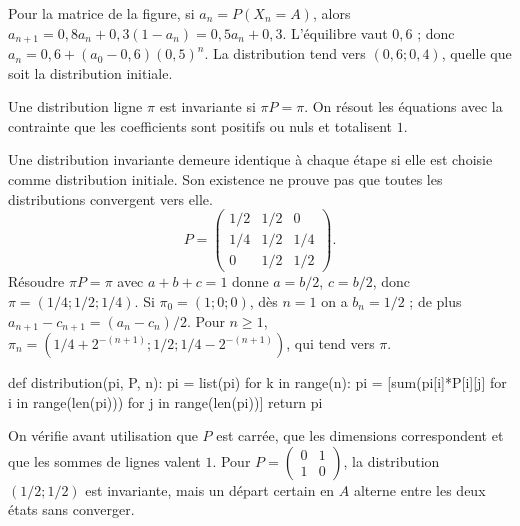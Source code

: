 Pour la matrice de la figure, si $a_n=P(X_n=A)$, alors $a_{n+1}=0{,}8a_n+0{,}3(1-a_n)=0{,}5a_n+0{,}3$.
L'équilibre vaut $0{,}6$ ; donc $a_n=0{,}6+(a_0-0{,}6)(0{,}5)^n$.
La distribution tend vers $(0{,}6;0{,}4)$, quelle que soit la distribution initiale.
\begin{definition}
Une distribution ligne $\pi$ est invariante si $\pi P=\pi$.
On résout les équations avec la contrainte que les coefficients sont positifs ou nuls et totalisent $1$.
\end{definition}
Une distribution invariante demeure identique à chaque étape si elle est choisie comme distribution initiale. Son existence ne prouve pas que toutes les distributions convergent vers elle.
\[P=\begin{pmatrix}1/2&1/2&0\\1/4&1/2&1/4\\0&1/2&1/2\end{pmatrix}.
\]
Résoudre $\pi P=\pi$ avec $a+b+c=1$ donne $a=b/2$, $c=b/2$, donc $\pi=(1/4;1/2;1/4)$.
Si $\pi_0=(1;0;0)$, dès $n=1$ on a $b_n=1/2$ ; de plus $a_{n+1}-c_{n+1}=(a_n-c_n)/2$.
Pour $n\geq1$,
$\pi_n=(1/4+2^{-(n+1)};1/2;1/4-2^{-(n+1)})$, qui tend vers $\pi$.
\begin{python}
def distribution(pi, P, n):
    pi = list(pi)
    for k in range(n):
        pi = [sum(pi[i]*P[i][j] for i in range(len(pi)))
              for j in range(len(pi))]
    return pi
\end{python}
On vérifie avant utilisation que $P$ est carrée, que les dimensions correspondent et que les sommes de lignes valent $1$.
Pour $P=\left(\begin{smallmatrix}0&1\\1&0\end{smallmatrix}\right)$, la distribution $(1/2;1/2)$ est invariante, mais un départ certain en $A$ alterne entre les deux états sans converger.

